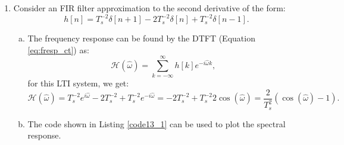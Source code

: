 \begin{enumerate}
\begin{enumerate}[a)]
          \item Claim: $|\mathcal{H}(\hat{\omega})|^{2}=|D_{M}(\hat{\omega})|^{2}$.
                \begin{proof}
                  A simple computation gives:
                  \begin{align*}
                    |\mathcal{H}(\hat{\omega})|^{2} & =\mathcal{H}(\hat{\omega})\mathcal{H}^{*}(\hat{\omega})=(D_{M}(\hat{\omega})\mathcal{H}_{\tau}(\hat{\omega}))(D_{M}(\hat{\omega})\mathcal{H}_{\tau}(\hat{\omega}))^{*}, \\
                                                    & =|D_{M}(\hat{\omega})|^{2}\underbrace{e^{-i\hat{\omega}\tau}e^{i\hat{\omega}\tau}}_{1}=|D_{M}(\hat{\omega})|^{2},
                  \end{align*}
                  as claimed.
                \end{proof}
                In conclusion, both running average filters produce the same magnitude response, 
                but one of them induces a time-shift while the other doesn't.
        \end{enumerate}

  \item Consider an FIR filter approximation to the second derivative of the form:
        \[ h[n]=T_{s}^{-2}\delta[n+1]-2T_{s}^{-2}\delta[n]+T_{s}^{-2}\delta[n-1]. \]

        \begin{enumerate}[a)]
          \item The frequency response can be found by the DTFT (Equation \ref{eq:fresp_ct}) as:
                \[ \mathcal{H}(\hat{\omega})=\sum_{k=-\infty}^{\infty}h[k]e^{-i\hat{\omega}k}, \]
                for this LTI system, we get:
                \[ \mathcal{H}(\hat{\omega})=T_{s}^{-2}e^{i\hat{\omega}}-2T_{s}^{-2}+T_{s}^{-2}e^{-i\hat{\omega}}=-2T_{s}^{-2}+T_{s}^{-2}2\cos(\hat{\omega})=\frac{2}{T_{s}^{2}}(\cos(\hat{\omega})-1). \]

          \item The code shown in Listing \ref{code13_1} can be used to plot the spectral response.
                


\end{enumerate}
\end{enumerate}
